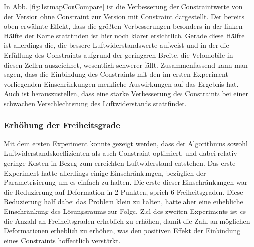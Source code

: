 In Abb. \cref{fig:1stmapConCompare} ist die Verbesserung der Constraintwerte von der Version ohne Constraint zur Version mit Constraint dargestellt.
Der bereits oben erwähnte Effekt, dass die größten Verbesserungen besonders in der linken Hälfte der Karte stattfinden ist hier noch klarer ersichtlich.
Gerade diese Hälfte ist allerdings die, die bessere Luftwiderstandswerte aufweist und in der die Erfüllung des Constraints aufgrund der geringeren Breite, die Velomobile in diesen Zellen auszeichnet, wesentlich schwerer fällt.
Zusammenfassend kann man sagen, dass die Einbindung des Constraints mit den im ersten Experiment vorliegenden Einschränkungen merkliche Auswirkungen auf das Ergebnis hat.
Auch ist herauszustellen, dass eine starke Verbesserung des Constraints bei einer schwachen Verschlechterung des Luftwiderstands stattfindet.

\subsubsection{Erhöhung der Freiheitsgrade}
\label{sub:exp2nd}
Mit dem ersten Experiment konnte gezeigt werden, dass der Algorithmus sowohl Luftwiderstandskoeffizienten als auch Constraint optimiert, und dabei relativ geringe Kosten in Bezug zum erreichten Luftwiderstand entstehen.
Das erste Experiment hatte allerdings einige Einschränkungen, bezüglich der Parametrisierung um es einfach zu halten.
Die erste dieser Einschränkungen war die Reduzierung auf Deformation in 2 Punkten, sprich 6 Freiheitsgraden.
Diese Reduzierung half dabei das Problem klein zu halten, hatte aber eine erhebliche Einschränkung des Lösungsraums zur Folge.
Ziel des zweiten Experiments ist es die Anzahl an Freiheitsgraden erheblich zu erhöhen, damit die Zahl an möglichen Deformationen erheblich zu erhöhen, was den positiven Effekt der Einbindung eines Constraints hoffentlich verstärkt.

